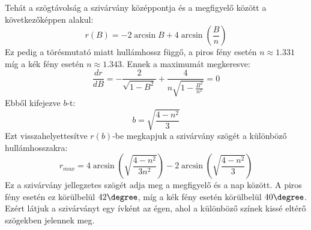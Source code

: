 \documentclass[a4paper,12pt]{article}
\begin{document}
Tehát a szögtávolság a szivárvány középpontja és a megfigyelő között a következőképpen alakul:
\begin{equation}
    r(B) = -2 \arcsin B + 4 \arcsin \left(\frac{B}{n}\right)
\end{equation}
Ez pedig a törésmutató miatt hullámhossz függő, a piros fény esetén $n \approx 1.331$ míg a kék fény esetén $n \approx 1.343$. 
Ennek a maximumát megkeresve:
\begin{equation}
    \frac{dr}{dB} = -\frac{2}{\sqrt{1 - B^2}} + \frac{4}{n \sqrt{1 - \frac{B^2}{n^2}}} = 0
\end{equation}
Ebből kifejezve $b$-t:
\begin{equation}
    b = \sqrt{\frac{4 - n^2}{3}}
\end{equation}
Ezt visszahelyettesítve $r(b)$-be megkapjuk a szivárvány szögét a különböző hullámhosszakra:
\begin{equation}
    r_{max} = 4 \arcsin \left(\sqrt{\frac{4 - n^2}{3 n^2}}\right) - 2 \arcsin \left(\sqrt{\frac{4 - n^2}{3}}\right)
\end{equation}
Ez a szivárvány jellegzetes szögét adja meg a megfigyelő és a nap között. A piros fény esetén ez körülbelül $42\degree$, míg a kék fény esetén körülbelül $40\degree$. Ezért látjuk a szivárványt egy ívként az égen, ahol a különböző színek kissé eltérő szögekben jelennek meg.
\end{document}
